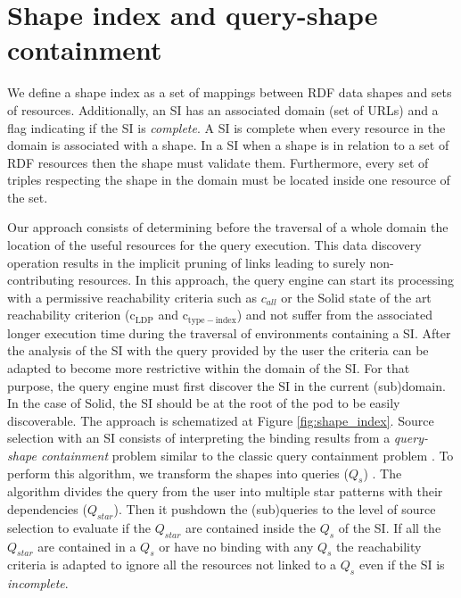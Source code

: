 \section{Shape index and query-shape containment}

We define a shape index as a set of mappings between RDF data shapes and sets of resources.
Additionally, an SI has an associated domain (set of URLs)
and a flag indicating if the SI is \emph{complete}.
A SI is complete when every resource in the domain is associated with a shape.
In a SI when a shape is in relation to a set of RDF resources then the shape must validate them.
Furthermore, every set of triples respecting the shape in the domain must be located inside one resource of the set.

Our approach consists of determining before the traversal of a whole domain the location of the useful resources for the query execution.
This data discovery operation results in the implicit pruning of links leading to surely non-contributing resources.
In this approach, the query engine can start its processing with a permissive reachability criteria
such as $c_{all}$ \cite{Hartig2012} or the Solid state of the art reachability criterion ($\mathrm{c_{LDP}}$ and $\mathrm{c_{type-index}}$) \cite{Taelman2023}
and not suffer from the associated longer execution time during the traversal of environments containing a SI.
After the analysis of the SI with the query provided by the user the criteria can be adapted to become more restrictive within the domain of the SI.
For that purpose, the query engine must first discover the SI in the current (sub)domain.
In the case of Solid, the SI should be at the root of the pod to be easily discoverable.
The approach is schematized at Figure \ref{fig:shape_index}.
Source selection with an SI consists of interpreting the binding results from a \emph{query-shape containment} problem similar to the classic query containment problem \cite{afariQCE, Spasi2023}.
To perform this algorithm, we transform the shapes into queries ($Q_{s}$) \cite{labragayo2017validating, Delva2021}.
The algorithm divides the query from the user into multiple star patterns with their dependencies ($Q_{star}$).
Then it pushdown \cite{Yang2021FlexPushdownDBHP} the (sub)queries to the level of source selection to evaluate if the $Q_{star}$ are contained inside the $Q_s$ of the SI.
If all the $Q_{star}$ are contained in a $Q_{s}$ or have no binding with any $Q_{s}$
the reachability criteria is adapted to ignore all the resources not linked to a $Q_{s}$ even if the SI is \emph{incomplete}.
